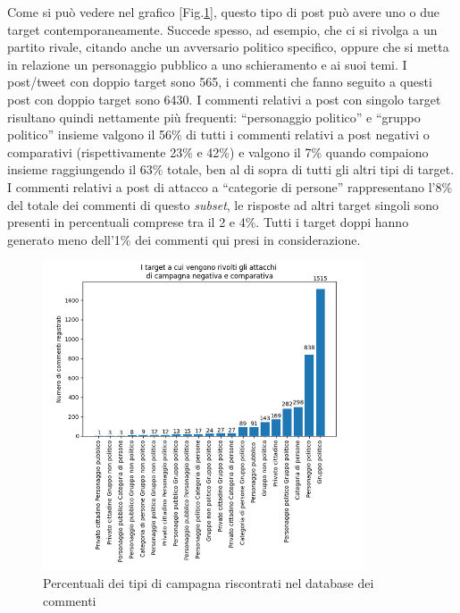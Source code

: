 Come si può vedere nel grafico [Fig.\ref{fig:target}], questo tipo di post può avere uno o due target contemporaneamente. Succede spesso, ad esempio, che ci si rivolga a un partito rivale, citando anche un avversario politico specifico, oppure che si metta in relazione un personaggio pubblico a uno schieramento e ai suoi temi. I post/tweet con doppio target sono 565, i commenti che fanno seguito a questi post con doppio target sono 6430. I commenti relativi a post con singolo target risultano quindi nettamente più frequenti: “personaggio politico” e “gruppo politico” insieme valgono il 56\% di tutti i commenti relativi a post negativi o comparativi (rispettivamente 23\% e 42\%) e valgono il 7\% quando compaiono insieme raggiungendo il 63\% totale, ben al di sopra di tutti gli altri tipi di target. I commenti relativi a post di attacco a “categorie di persone” rappresentano l'8\% del totale dei commenti di questo \textit{subset}, le risposte ad altri target singoli sono presenti in percentuali comprese tra il 2 e 4\%. Tutti i target doppi hanno generato meno dell'1\% dei commenti qui presi in considerazione.
\begin{figure}
	\centering
	\includegraphics[width=0.85\textwidth]{figures/target}
	\caption{Percentuali dei tipi di campagna riscontrati nel database dei commenti}
	\label{fig:target}
\end{figure}

